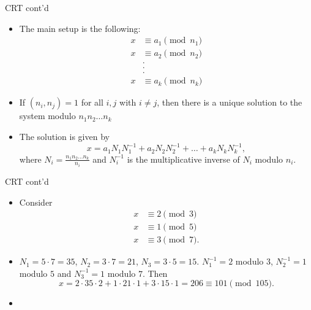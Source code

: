 \documentclass[ %
 usenames,dvipsnames,
aspectratio=169,11pt ]{beamer}
\newenvironment{stepitemize}{\begin{itemize}[<+->]}{\end{itemize} }
\begin{document}
\begin{frame}{CRT cont'd}
    \begin{stepitemize}
    \item The main setup is the following:
    \begin{align*}
    x &\equiv a_1 \pmod{n_1} \\
    x &\equiv a_2 \pmod{n_2} \\
    &.\\
    &.\\
    &.\\
    x &\equiv a_k \pmod{n_k}
\end{align*}
\item If $(n_i,n_j)=1$ for all $i,j$ with $i\neq j$, then there is a unique solution to the system modulo $n_1n_2\dots n_k$
\item The solution is given by $$x=a_1N_1N_1^{-1}+a_2N_2N_2^{-1}+\dots +a_kN_kN_k^{-1},$$ where $N_i=\frac{n_1n_2\dots n_k}{n_i}$ and $N_i^{-1}$ is the multiplicative inverse of $N_i$ modulo $n_i$.
    \end{stepitemize}
\end{frame}

\begin{frame}{CRT cont'd}
\begin{stepitemize}
    \item Consider \begin{align*}
    x &\equiv 2 \pmod{3} \\
    x &\equiv 1 \pmod{5} \\
    x &\equiv 3 \pmod{7}.
    \end{align*}
    \item $N_1=5\cdot 7=35$, $N_2=3\cdot 7=21$, $N_3=3\cdot 5=15$.
$N_1^{-1}=2$ modulo $3$, $N_2^{-1}=1$ modulo $5$ and $N_3^{-1} = 1$ modulo $7$. Then
$$x = 2\cdot 35\cdot 2+1\cdot 21\cdot 1+3\cdot 15\cdot 1 = 206 \equiv 101 \pmod{105}.$$
\item[]
\begin{center}
\end{center}
\end{stepitemize}
    \end{frame}
\end{document}
